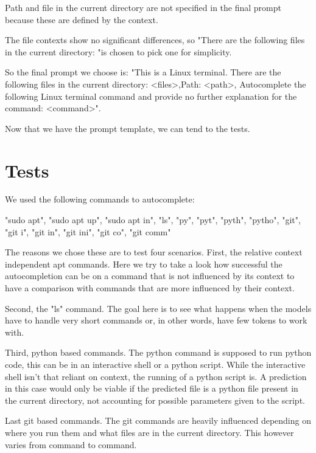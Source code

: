 Path and file in the current directory are not specified in the final prompt because these are defined by the context.



The file contexts show no significant differences, so "There are the following files in the current  directory: "is chosen to pick one for simplicity.




So the final prompt we choose is: "This is a Linux terminal. There are the following files in the current  directory: <files>,Path: <path>, Autocomplete the following Linux terminal command and provide no further explanation for the command: <command>".



Now that we have the prompt template, we can tend to the tests.

\section{Tests}

We used the following commands to autocomplete:

"sudo apt", "sudo apt up", "sudo apt in", "ls", "py", "pyt", "pyth", "pytho", "git", "git i", "git in", "git ini", "git co", "git comm"


The reasons we chose these are to test four scenarios. First, the relative context independent apt commands. Here we try to take a look how successful the autocompletion can be on a command that is not influenced by its context to have a comparison with commands that are more influenced by their context.



Second, the  "ls" command. The goal here is to see what happens when the models have to handle very short commands or, in other words, have few tokens to work with.



Third, python based commands. The python command is supposed to run python code, this can be in an interactive shell or a python script. While the interactive shell isn't that reliant on context, the running of a python script is. A prediction in this case would only be viable if the predicted file is a python file present in the current directory, not accounting for possible parameters given to the script.



Last git based commands. The git commands are heavily influenced depending on where you run them and what files are in the current directory. This however varies from command to command.


